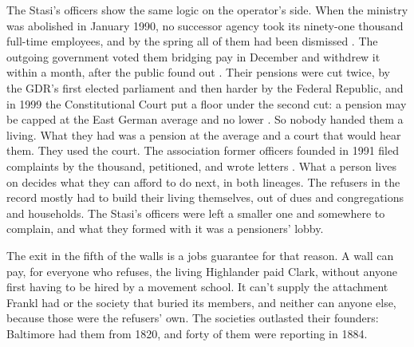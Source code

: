 The Stasi's officers show the same logic on the operator's side. When the ministry was abolished in January 1990, no successor agency took its ninety-one thousand full-time employees, and by the spring all of them had been dismissed \autocite{bpb2023stasi,suess2026aufloesung}. The outgoing government voted them bridging pay in December and withdrew it within a month, after the public found out \autocite{sauer1990zwischenbericht}. Their pensions were cut twice, by the GDR's first elected parliament and then harder by the Federal Republic, and in 1999 the Constitutional Court put a floor under the second cut: a pension may be capped at the East German average and no lower \autocite{bverfg1999aaueg}. So nobody handed them a living. What they had was a pension at the average and a court that would hear them. They used the court. The association former officers founded in 1991 filed complaints by the thousand, petitioned, and wrote letters \autocite{bouma2014strategies}. What a person lives on decides what they can afford to do next, in both lineages. The refusers in the record mostly had to build their living themselves, out of dues and congregations and households. The Stasi's officers were left a smaller one and somewhere to complain, and what they formed with it was a pensioners' lobby.

The exit in the fifth of the walls is a jobs guarantee for that reason. A wall can pay, for everyone who refuses, the living Highlander paid Clark, without anyone first having to be hired by a movement school. It can't supply the attachment Frankl had or the society that buried its members, and neither can anyone else, because those were the refusers' own. The societies outlasted their founders: Baltimore had them from 1820, and forty of them were reporting in 1884.

